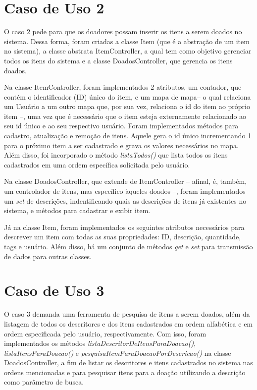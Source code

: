 \documentclass[journal,12pt,onecolumn,draftclsnofoot,]{article}
\begin{document}
	\section{Caso de Uso 2}
	O caso 2 pede para que os doadores possam inserir os itens a serem doados no sistema. Dessa forma, foram criadas a classe Item (que é a abstração de um item no sistema), a classe abstrata ItemController, a qual tem como objetivo gerenciar todos os itens do sistema e a classe DoadosController, que gerencia os itens doados.
	
	Na classe ItemController, foram implementados 2 atributos, um contador, que contém o identificador (ID) único do item, e um mapa de mapa-- o qual relaciona um Usuário a um outro mapa que, por sua vez, relaciona o id do item ao próprio item --, uma vez que é necessário que o item esteja externamente relacionado ao seu id único e ao seu respectivo usuário. Foram implementados métodos para cadastro, atualização e remoção de itens. Aquele gera o id único incrementando 1 para o próximo item a ser cadastrado e grava os valores necessários no mapa. Além disso, foi incorporado o método \textit{listaTodos()} que lista todos os itens cadastrados em uma ordem específica solicitada pelo usuário. 

	Na classe DoadosController, que extende de ItemController -- afinal, é, também, um controlador de itens, mas específico àqueles doados --, foram implementados um \textit{set} de descrições, indentificando quais as descrições de itens já existentes no sistema, e métodos para cadastrar e exibir item.

	Já na classe Item, foram implementados os seguintes atributos necessários para descrever um item com todas as suas propriedades: ID, descrição, quantidade, tags e usuário. Além disso, há um conjunto de métodos \textit{get} e \textit{set} para transmissão de dados para outras classes.
	
	
	\section{Caso de Uso 3}
	O caso 3 demanda uma ferramenta de pesquisa de itens a serem doados, além da listagem de todos os descritores e dos itens cadastrados em ordem alfabética e em ordem especificada pelo usuário, respectivamente. Com isso, foram implementados os métodos \textit{listaDescritorDeItensParaDoacao()}, \textit{listaItensParaDoacao()} e \textit{pesquisaItemParaDoacaoPorDescricao()} na classe DoadosController, a fim de listar os descritores e itens cadastrados no sistema nas ordens mencionadas e para pesquisar itens para a doação utilizando a descrição como parâmetro de busca.
	
\end{document}
